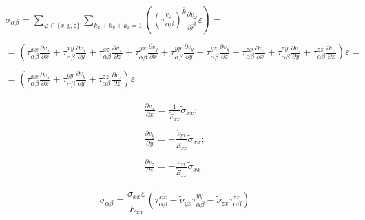 \documentclass[a4paper,12pt]{article}
\begin{document}
\begin{equation}
    \begin{array}{c}
        {\sigma_{\alpha\beta}} = \sum\limits_{\varphi \in \{x,y,z\}}
        \sum\limits_{k_x+k_y+k_z=1}\left( 
        \left(\tau_{\alpha\beta}^{v_{\varphi}}\right)^{\bar{k}}
        \frac{\partial v_{\varphi}}{\partial \bar{r}^{\bar{k}}}
    \varepsilon \right) = \\ \\
    = \left(\tau_{\alpha\beta}^{xx} \frac{\partial v_{x}}{\partial x} +
    \tau_{\alpha\beta}^{xy} \frac{\partial v_{x}}{\partial y} +
    \tau_{\alpha\beta}^{xz} \frac{\partial v_{x}}{\partial z} +
    \tau_{\alpha\beta}^{yx} \frac{\partial v_{y}}{\partial x} +
    \tau_{\alpha\beta}^{yy} \frac{\partial v_{y}}{\partial y} +
    \tau_{\alpha\beta}^{yz} \frac{\partial v_{y}}{\partial z} +
    \tau_{\alpha\beta}^{zx} \frac{\partial v_{z}}{\partial x} +
    \tau_{\alpha\beta}^{zy} \frac{\partial v_{z}}{\partial y} +
    \tau_{\alpha\beta}^{zz} \frac{\partial v_{z}}{\partial z}\right)\varepsilon = \\ \\
    = \left(\tau_{\alpha\beta}^{xx} \frac{\partial v_{x}}{\partial x} +
    \tau_{\alpha\beta}^{yy} \frac{\partial v_{y}}{\partial y} +
    \tau_{\alpha\beta}^{zz} \frac{\partial v_{z}}{\partial z}\right)\varepsilon 
    \end{array} 
\end{equation} 

\begin{equation}
    \begin{array}{c}
        \frac{\partial v_{x}}{\partial x} =
        \frac{1}{\widetilde{E}_{xx}}\widetilde{\sigma}_{xx}; \\ \\
        \frac{\partial v_{y}}{\partial y} = -
        \frac{\widetilde{\nu}_{yx}}{\widetilde{E}_{xx}}\widetilde{\sigma}_{xx}; \\ \\
        \frac{\partial v_{z}}{\partial z} = -
        \frac{\widetilde{\nu}_{zx}}{\widetilde{E}_{xx}}\widetilde{\sigma}_{xx}
    \end{array} 
\end{equation} 

\begin{equation}
    {\sigma_{\alpha\beta}} = \frac{\widetilde{\sigma}_{xx}\varepsilon}{\widetilde{E}_{xx}}
    \left(\tau_{\alpha\beta}^{xx} -
    \widetilde{\nu}_{yx} \tau_{\alpha\beta}^{yy} -
    \widetilde{\nu}_{zx} \tau_{\alpha\beta}^{zz}\right)
\end{equation} 
\end{document}
